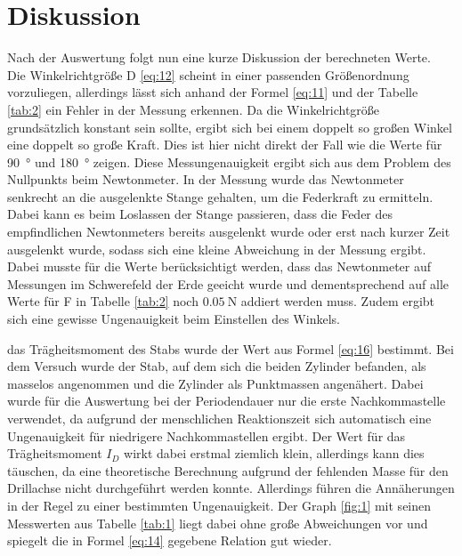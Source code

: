 
\section{Diskussion}\justifying
Nach der Auswertung folgt nun eine kurze Diskussion der berechneten Werte.\\
Die Winkelrichtgröße D \eqref{eq:12} scheint in einer passenden
Größenordnung vorzuliegen, allerdings lässt sich anhand der Formel \eqref{eq:11}
und der Tabelle \ref{tab:2} ein Fehler in der Messung erkennen.
Da die Winkelrichtgröße grundsätzlich konstant sein sollte, ergibt sich bei einem
doppelt so großen Winkel eine doppelt so große Kraft. Dies ist hier nicht direkt der Fall
wie die Werte für \SI{90}{\degree} und \SI{180}{\degree} zeigen. Diese Messungenauigkeit
ergibt sich aus dem Problem des Nullpunkts beim Newtonmeter. In der Messung wurde das
Newtonmeter senkrecht an die ausgelenkte Stange gehalten, um die Federkraft zu ermitteln. Dabei kann es
beim Loslassen der Stange passieren, dass die Feder des empfindlichen Newtonmeters bereits ausgelenkt wurde oder 
erst nach kurzer Zeit ausgelenkt wurde, sodass sich eine kleine Abweichung in der Messung ergibt.
Dabei musste für die Werte berücksichtigt werden, dass das Newtonmeter auf Messungen im 
Schwerefeld der Erde geeicht wurde und dementsprechend auf alle Werte für F in Tabelle 
\ref{tab:2} noch $\SI{0.05}{\newton} $ addiert werden muss.
Zudem ergibt sich eine gewisse Ungenauigkeit beim Einstellen des Winkels. 

\justifying das Trägheitsmoment des Stabs wurde der Wert aus Formel \eqref{eq:16} bestimmt.
Bei dem Versuch wurde der Stab, auf dem sich die beiden Zylinder befanden, als masselos angenommen  und
die Zylinder als Punktmassen angenähert. Dabei wurde für die Auswertung bei der Periodendauer
nur die erste Nachkommastelle verwendet, da aufgrund der menschlichen Reaktionszeit sich
automatisch eine Ungenauigkeit für niedrigere Nachkommastellen ergibt.
Der Wert für das Trägheitsmoment $I_D$ wirkt dabei erstmal ziemlich klein, allerdings kann
dies täuschen, da eine theoretische Berechnung aufgrund der fehlenden Masse für den 
Drillachse nicht durchgeführt werden konnte. Allerdings führen die Annäherungen in der 
Regel zu einer bestimmten Ungenauigkeit.
Der Graph \ref{fig:1} mit seinen Messwerten aus Tabelle \ref{tab:1} liegt dabei ohne große 
Abweichungen vor und spiegelt die in Formel \eqref{eq:14} gegebene Relation gut wieder.

